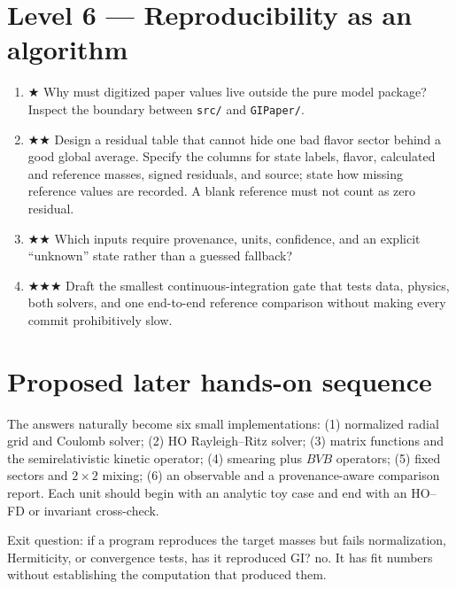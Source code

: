 \documentclass[11pt]{article}
\begin{document}
\section*{Level 6 — Reproducibility as an algorithm}
\begin{enumerate}[resume]
\item ★ Why must digitized paper values live outside the pure model package?
Inspect the boundary between \texttt{src/} and \texttt{GIPaper/}.
\item ★★ Design a residual table that cannot hide one bad flavor sector behind
a good global average. Specify the columns for state labels, flavor,
calculated and reference masses, signed residuals, and source; state how missing
reference values are recorded. A blank reference must not count as zero residual.
\item ★★ Which inputs require provenance, units, confidence, and an explicit
``unknown'' state rather than a guessed fallback?
\item ★★★ Draft the smallest continuous-integration gate that tests data,
physics, both solvers, and one end-to-end reference comparison without making
every commit prohibitively slow.
\end{enumerate}

\section*{Proposed later hands-on sequence}
The answers naturally become six small implementations: (1) normalized radial
grid and Coulomb solver; (2) HO Rayleigh--Ritz solver; (3) matrix functions and
the semirelativistic kinetic operator; (4) smearing plus $BVB$ operators; (5)
fixed sectors and $2\times2$ mixing; (6) an observable and a provenance-aware
comparison report. Each unit should begin with an analytic toy case and end with
an HO--FD or invariant cross-check.

\begin{quiz}
Exit question: if a program reproduces the target masses but fails normalization,
Hermiticity, or convergence tests, has it reproduced GI? \answer no. It has fit
numbers without establishing the computation that produced them.
\end{quiz}
\end{document}
